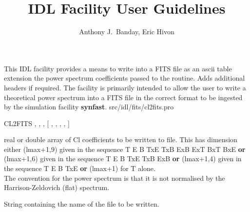 



\sloppy



\title{\healpix IDL Facility User Guidelines}
 \section[cl2fits]{ }
\label{idl:cl2fits}
\author{Anthony J.~Banday, Eric Hivon}




\begin{facility}
{This IDL facility provides a means to
write into a FITS file as an ascii table extension the power 
spectrum coefficients passed to the routine. Adds additional
headers if required. The facility is primarily intended to allow the
user to write a theoretical power spectrum into a FITS file in 
the correct format to be ingested by the \healpix simulation facility 
\textbf{synfast}.
}
{src/idl/fits/cl2fits.pro}
\end{facility}

\begin{IDLformat}
{{CL2FITS}%
, %
, %
, [%
, %
, %
, %
, %
]}
\end{IDLformat}

\begin{qualifiers}
  \begin{qulist}{} %
    \item[cl\_array\mytarget{idl:cl2fits:cl_array}%
] real or double array of Cl coefficients to be written to
      file. This has dimension either (lmax+1,9) given in the sequence T E B
      TxE TxB ExB ExT BxT BxE {\bf or} (lmax+1,6) given in the sequence T E B
      TxE TxB ExB {\bf or} (lmax+1,4) given in the sequence T E B
      TxE {\bf or} (lmax+1) for T alone. \\
      The convention for the power spectrum is that it is not
      normalised by the Harrison-Zeldovich (flat) spectrum.
    \item[fitsfile\mytarget{idl:cl2fits:fitsfile}%
] String containing the name of the file to be written.
  \end{qulist}
\end{qualifiers}

